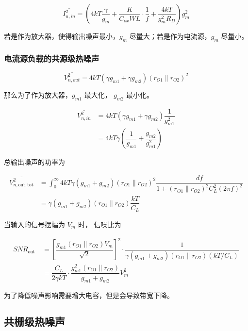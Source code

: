 \documentclass[cn,11pt,chinese,black,simple]{../elegantbook}
\begin{document}
\[\overline{I_{n,in}^2} = (4 k T \dfrac{\gamma}{g_{m}}+\dfrac{K}{C_{o x} W L} \cdot \dfrac{1}{f}+\dfrac{4 k T}{g_{m}^{2} R_{D}}) g_m^2\]

若是作为放大器，使得输出噪声最小，\(g_m\) 尽量大；若是作为电流源，\(g_m\) 尽量小。

\subsubsection{电流源负载的共源级热噪声}

\[\overline{V_{n,  {out}}^{2}}=4 k T\left(\gamma g_{m 1}+\gamma g_{m 2}\right)\left(r_{O 1} \| r_{O 2}\right)^{2}\]

那么为了作为放大器，\(g_{m1}\) 最大化， \(g_{m2}\) 最小化。

\[\begin{aligned}
    \overline{V_{n, in}^{2}} &=4 k T\left(\gamma g_{m 1}+\gamma g_{m 2}\right) \dfrac{1}{g_{m 1}^{2}} \\
    &=4 k T \gamma\left(\dfrac{1}{g_{m 1}}+\dfrac{g_{m 2}}{g_{m 1}^{2}}\right)
\end{aligned}\]

总输出噪声的功率为

\[
    \begin{aligned}
\overline{V_{n, \text {out}, \text {tot}}^{2}}&=\int_{0}^{\infty} 4 k T \gamma\left(g_{m 1}+g_{m 2}\right)\left(r_{O 1} \| r_{O 2}\right)^{2} \dfrac{d f}{1+\left(r_{O 1} \| r_{O 2}\right)^{2} C_{L}^{2}(2 \pi f)^{2}}\\
 &= \gamma\left(g_{m 1}+g_{m 2}\right)\left(r_{O 1} \| r_{O 2}\right) \dfrac{k T}{C_{L}}
    \end{aligned}
\]


当输入的信号摆幅为 \(V_m\) 时， 信噪比为

\[\begin{aligned}
    SNR _{\text {out }} &=\left[\dfrac{g_{m 1}\left(r_{O 1} \| r_{O 2}\right) V_{m}}{\sqrt{2}}\right]^{2} \cdot \dfrac{1}{\gamma\left(g_{m 1}+g_{m 2}\right)\left(r_{O 1} \| r_{O 2}\right)\left(k T / C_{L}\right)} \\
    &=\dfrac{C_{L}}{2 \gamma k T} \cdot \dfrac{g_{m 1}^{2}\left(r_{O 1} \| r_{O 2}\right)}{g_{m 1}+g_{m 2}} V_{m}^{2}
\end{aligned}\]

为了降低噪声影响需要增大电容，但是会导致带宽下降。

\subsection{共栅级热噪声}
\end{document}
